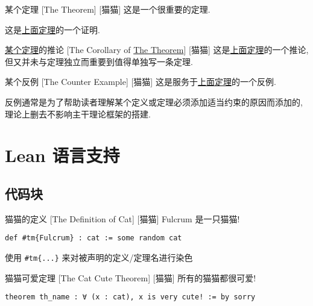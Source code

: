\documentclass[UTF8]{ctexart}
\begin{document}
        \begin{thm}
            [TheTheorem]
            {某个定理}
            [The Theorem]
            [猫猫]
            这是一个很重要的定理. 
        \end{thm}
            
        \begin{prf}
            这是\hyperref[thm:TheTheorem]{上面定理}的一个证明. 
        \end{prf}
        
        \begin{crl}
            [TheCorollary]
            {\hyperref[thm:TheTheorem]{某个定理}的推论}
            [The Corollary of \hyperref[thm:TheTheorem]{The Theorem}]
            [猫猫]
            这是\hyperref[thm:TheTheorem]{上面定理}的一个推论, 但又并未与定理独立而重要到值得单独写一条定理. 
        \end{crl}
        
        \begin{cxmp}
            [TheCounterExample]
            {某个反例}
            [The Counter Example]
            [猫猫]
            这是服务于\hyperref[thm:TheTheorem]{上面定理}的一个反例. 
            
            反例通常是为了帮助读者理解某个定义或定理必须添加适当约束的原因而添加的, 理论上删去不影响主干理论框架的搭建. 
        \end{cxmp}

    \section{Lean 语言支持}

        \subsection{代码块}

        
        \begin{dfn}
            [Cat]
            {猫猫的定义}
            [The Definition of Cat]
            [猫猫]
            Fulcrum 是一只猫猫! 
            \begin{lstlisting}[style=lean]
    def #tm{Fulcrum} : cat := some random cat
            \end{lstlisting}

            使用 \texttt{\#tm\{...\}} 来对被声明的定义/定理名进行染色
        \end{dfn}
        
        \begin{thm}
            [CatCuteTheorem]
            {猫猫可爱定理}
            [The Cat Cute Theorem]
            [猫猫]
            所有的猫猫都很可爱! 
            \begin{lstlisting}[style=lean]
    theorem th_name : ∀ (x : cat), x is very cute! := by sorry
            \end{lstlisting}
        \end{thm}
\end{document}
